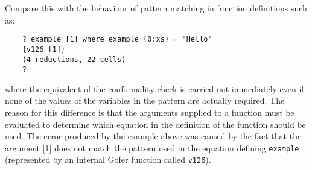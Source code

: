 Compare this  with  the  behaviour  of  pattern  matching  in  function
definitions such as:
\begin{verbatim}
    ? example [1] where example (0:xs) = "Hello"
    {v126 [1]}
    (4 reductions, 22 cells)
    ?
\end{verbatim}
where  the  equivalent  of  the  conformality  check  is  carried   out
immediately even if none of the values of the variables in the  pattern
are actually required.  The reason for  this  difference  is  that  the
arguments supplied to a function must be evaluated to  determine  which
equation in the definition of the function should be used.   The  error
produced by the example above was caused by the fact that the  argument
[1] does not match the pattern used in the equation defining  \verb"example"
(represented by an internal Gofer function called \verb"v126").

